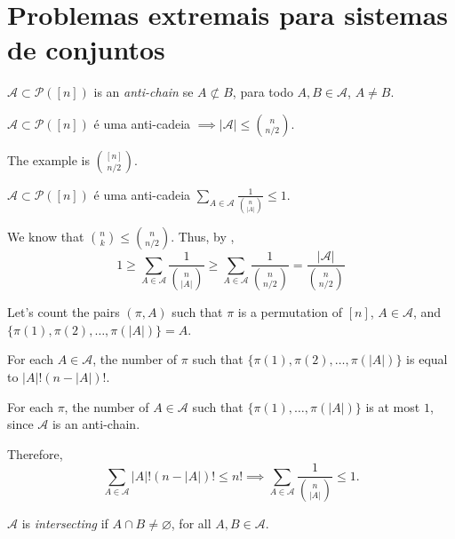 \newpage\section{Problemas extremais para sistemas de conjuntos}

\begin{defn}
	$\mathcal{A} \subset \mathcal{P}([n])$ is an \emph{anti-chain} se  $A \not\subset B$, para todo $A, B \in \mathcal{A}$, $A \neq B$.
\end{defn}

\begin{thm}[Sperner, 1910's] \label{thm:sperner}
	$\mathcal A \subset \mathcal P([n])$ é uma anti-cadeia $\implies |\mathcal A| \le \binom{n}{n/2}$.
\end{thm}

The example is $\binom{[n]}{n/2}$.

\begin{lem}[LYMB, 1960's]\label{lem:lymb}
	$\mathcal A \subset \mathcal P([n])$ é uma anti-cadeia $\sum_{A \in \mathcal A} \frac{1}{\binom{n}{|A|}} \leq 1$.
\end{lem}

\begin{dem}
	We know that $\binom{n}{k} \le \binom{n}{n/2}$. Thus, by , \[
		1 \ge \sum_{A\in \mathcal{A}} \frac{1}{\binom{n}{|A|}} \ge \sum_{A\in \mathcal{A}} \frac{1}{\binom{n}{n/2}} = \frac{|\mathcal{A}|}{\binom{n}{n/2}}
	\]
\end{dem}

\begin{dem}
	Let's count the pairs $(\pi, A)$ such that $\pi$ is a permutation of $[n]$, $A \in \mathcal{A}$, and  $\{\pi(1), \pi(2), \dots, \pi(|A|)\} = A$.

	For each $A \in \mathcal{A}$, the number of $\pi$ such that $\{\pi(1), \pi(2), \dots, \pi(|A|)\}$ is equal to $|A|!(n - |A|)!$.

	For each $\pi$, the number of $A \in \mathcal{A}$ such that $\{\pi(1), \dots, \pi(|A|)\}$ is at most $1$, since $\mathcal{A}$ is an anti-chain.

	Therefore, \[
		\sum_{A \in \mathcal{A}} |A|!(n-|A|)! \le n!
		\implies
		\sum_{A \in \mathcal{A}} \frac{1}{\binom{n}{|A|}} \le 1.
	\]
\end{dem}

\begin{defn}
	$\mathcal{A}$ is \emph{intersecting} if $A \cap B \neq \varnothing$, for all  $A, B \in \mathcal{A}$.
\end{defn}


